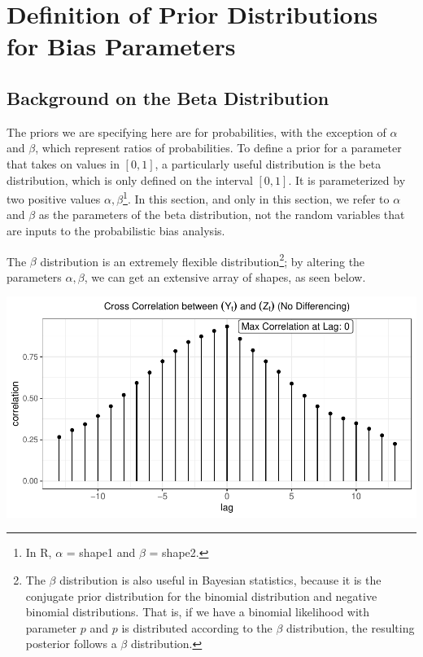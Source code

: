 \documentclass[12pt,twoside]{smiththesis}
\begin{document}
\hypertarget{definition-of-prior-distributions-for-bias-parameters}{%
\chapter{Definition of Prior Distributions for Bias Parameters}\label{definition-of-prior-distributions-for-bias-parameters}}

\hypertarget{background-on-the-beta-distribution}{%
\section{Background on the Beta Distribution}\label{background-on-the-beta-distribution}}

The priors we are specifying here are for probabilities, with the exception of \(\alpha\) and \(\beta\), which represent ratios of probabilities. To define a prior for a parameter that takes on values in \([0,1]\), a particularly useful distribution is the beta distribution, which is only defined on the interval \([0,1]\). It is parameterized by two positive values \(\alpha, \beta\)\footnote{In R, \(\alpha\) = shape1 and \(\beta\) = shape2.}. In this section, and only in this section, we refer to \(\alpha\) and \(\beta\) as the parameters of the beta distribution, not the random variables that are inputs to the probabilistic bias analysis.

The \(\beta\) distribution is an extremely flexible distribution\footnote{The \(\beta\) distribution is also useful in Bayesian statistics, because it is the conjugate prior distribution for the binomial distribution and negative binomial distributions. That is, if we have a binomial likelihood with parameter \(p\) and \(p\) is distributed according to the \(\beta\) distribution, the resulting posterior follows a \(\beta\) distribution.}; by altering the parameters \(\alpha, \beta\), we can get an extensive array of shapes, as seen below.

\includegraphics[width=0.8\linewidth]{thesis_files/figure-latex/unnamed-chunk-25-1}
\end{document}
